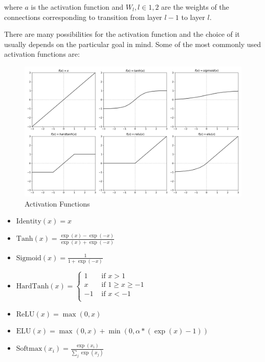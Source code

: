 where $a$ is the activation function and $W_l, l \in {1, 2}$ are the weights of the connections corresponding to transition from layer $l-1$ to layer $l$.

There are many possibilities for the activation function and the choice of it usually depends on the particular goal in mind.
Some of the most commonly used activation functions are:

\begin{figure}
    \centering
    \includegraphics[width=\linewidth]{imgs_tomas/activation_functions.png} %
    \caption{Activation Functions}
    \label{fig:activation_functions}
\end{figure}

\begin{itemize}
    \item $\text{Identity}(x) = x$
    \item $\text{Tanh}(x) = \frac{\exp(x) - \exp(-x)}{\exp(x) + \exp(-x)}$
    \item $\text{Sigmoid}(x) = \frac{1}{1 + \exp(-x)}$
    \item $\text{HardTanh}(x) = \begin{cases}
             1 & \text{ if } x > 1 \\
             x & \text{ if } 1 \geq x \geq -1 \\
            -1 & \text{ if } x < -1 \\
          \end{cases}$
    \item $\text{ReLU}(x) = \max(0, x)$
    \item $\text{ELU}(x) = \max(0,x) + \min(0, \alpha * (\exp(x) - 1))$
    \item $\text{Softmax}(x_{i}) = \frac{\exp(x_i)}{\sum_j \exp(x_j)}$
    \label{list:activations}
\end{itemize}

